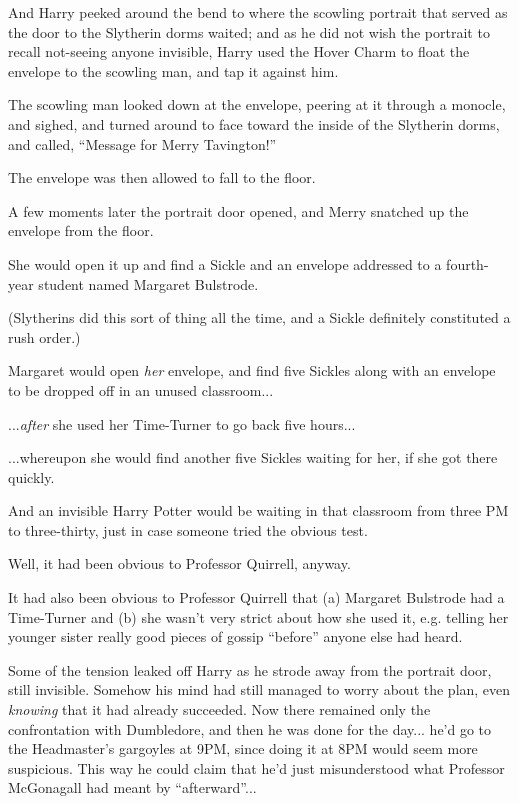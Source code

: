 And Harry peeked around the bend to where the scowling portrait that
served as the door to the Slytherin dorms waited; and as he did not wish
the portrait to recall not-seeing anyone invisible, Harry used the Hover
Charm to float the envelope to the scowling man, and tap it against him.

The scowling man looked down at the envelope, peering at it through a
monocle, and sighed, and turned around to face toward the inside of the
Slytherin dorms, and called, ``Message for Merry Tavington!''

The envelope was then allowed to fall to the floor.

A few moments later the portrait door opened, and Merry snatched up the
envelope from the floor.

She would open it up and find a Sickle and an envelope addressed to a
fourth-year student named Margaret Bulstrode.

(Slytherins did this sort of thing all the time, and a Sickle definitely
constituted a rush order.)

Margaret would open \emph{her} envelope, and find five Sickles along
with an envelope to be dropped off in an unused classroom...

...\emph{after} she used her Time-Turner to go back five
hours...

...whereupon she would find another five Sickles waiting for her,
if she got there quickly.

And an invisible Harry Potter would be waiting in that classroom from
three PM to three-thirty, just in case someone tried the obvious test.

Well, it had been obvious to Professor Quirrell, anyway.

It had also been obvious to Professor Quirrell that (a) Margaret
Bulstrode had a Time-Turner and (b) she wasn't very strict about how she
used it, e.g. telling her younger sister really good pieces of gossip
``before'' anyone else had heard.

Some of the tension leaked off Harry as he strode away from the portrait
door, still invisible. Somehow his mind had still managed to worry about
the plan, even \emph{knowing} that it had already succeeded. Now there
remained only the confrontation with Dumbledore, and then he was done
for the day... he'd go to the Headmaster's gargoyles at 9PM, since
doing it at 8PM would seem more suspicious. This way he could claim that
he'd just misunderstood what Professor McGonagall had meant by
``afterward''...

